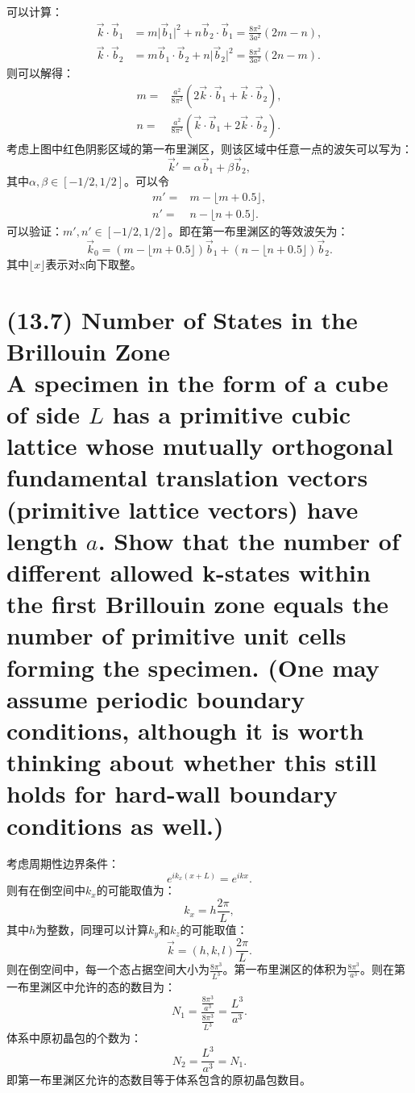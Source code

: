 \documentclass[reqno,a4paper,12pt]{amsart}
\begin{document}
\begin{tcolorbox}[breakable, colback = black!5!white, colframe = black]
\[\]
可以计算：
\begin{align*}
	\vec{k} \cdot \vec{b}_1 &= m \vert \vec{b}_1 \vert^2 + n \vec{b}_2 \cdot \vec{b}_1 = \frac{8\pi^2}{3a^2}(2m-n), \\
	\vec{k} \cdot \vec{b}_2 &= m \vec{b}_1 \cdot \vec{b}_2 + n\vert \vec{b}_2 \vert^2 = \frac{8\pi^2}{3a^2}(2n-m).
\end{align*}
则可以解得：
\begin{align*}
	m =& \frac{a^2}{8\pi^2}(2\vec{k} \cdot \vec{b}_1 + \vec{k} \cdot \vec{b}_2), \\
	n =& \frac{a^2}{8\pi^2}(\vec{k} \cdot \vec{b}_1 + 2\vec{k} \cdot \vec{b}_2).
\end{align*}
考虑上图中红色阴影区域的第一布里渊区，则该区域中任意一点的波矢可以写为：
\[
	\vec{k}' = \alpha \vec{b}_1 + \beta \vec{b}_2,
\]
其中$\alpha, \beta \in [-1/2, 1/2]$。可以令
\begin{align*}
	m' =& m - \lfloor m+0.5 \rfloor, \\
	n' =& n - \lfloor n+0.5 \rfloor.
\end{align*}
可以验证：$m', n' \in [-1/2, 1/2]$。即在第一布里渊区的等效波矢为：
\[
	\vec{k}_0 = (m - \lfloor m+0.5 \rfloor) \vec{b}_1 + (n - \lfloor n+0.5 \rfloor) \vec{b}_2.
\]
其中$\lfloor x \rfloor$表示对x向下取整。
\end{tcolorbox}

\section{\textbf{(13.7) Number of States in the Brillouin Zone} \\
A specimen in the form of a cube of side $L$ has a primitive cubic lattice whose mutually orthogonal fundamental translation vectors (primitive lattice vectors) have length $a$. Show that the number of different allowed \textbf{k-}states within the first Brillouin zone equals the number of primitive unit cells forming the specimen. (One may assume periodic boundary conditions, although it is worth thinking about whether this still holds for hard-wall boundary conditions as well.)
}
\begin{tcolorbox}[breakable, colback = black!5!white, colframe = black]
考虑周期性边界条件：
\[
	e^{ik_x(x+L)} = e^{ikx}.
\]
则有在倒空间中$k_x$的可能取值为：
\[
	k_x = h\frac{2\pi}{L},
\]
其中$h$为整数，同理可以计算$k_y$和$k_z$的可能取值：
\[
	\vec{k} = (h,k,l)\frac{2\pi}{L}.
\]
则在倒空间中，每一个态占据空间大小为$\frac{8\pi^3}{L^3}$。第一布里渊区的体积为$\frac{8\pi^3}{a^3}$。则在第一布里渊区中允许的态的数目为：
\[
	N_1 = \frac{\frac{8\pi^3}{a^3}}{\frac{8\pi^3}{L^3}} = \frac{L^3}{a^3}.
\]
体系中原初晶包的个数为：
\[
	N_2 = \frac{L^3}{a^3} = N_1.
\]
即第一布里渊区允许的态数目等于体系包含的原初晶包数目。
\end{tcolorbox}
\end{document}
